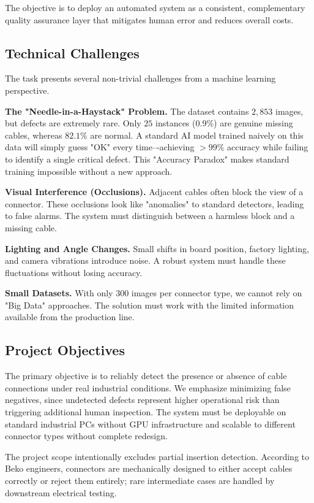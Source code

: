 \documentclass[11pt,a4paper]{article}
\begin{document}
The objective is to deploy an automated system as a consistent, complementary quality assurance layer that mitigates human error and reduces overall costs.

\subsection{Technical Challenges}

The task presents several non-trivial challenges from a machine learning perspective.

\textbf{The "Needle-in-a-Haystack" Problem.} The dataset contains $2,853$ images, but defects are extremely rare. Only $25$ instances ($0.9\%$) are genuine missing cables, whereas $82.1\%$ are normal. A standard AI model trained naively on this data will simply guess "OK" every time–-achieving $>99\%$ accuracy while failing to identify a single critical defect. This "Accuracy Paradox" makes standard training impossible without a new approach.

\textbf{Visual Interference (Occlusions).} Adjacent cables often block the view of a connector. These occlusions look like "anomalies" to standard detectors, leading to false alarms. The system must distinguish between a harmless block and a missing cable.

\textbf{Lighting and Angle Changes.} Small shifts in board position, factory lighting, and camera vibrations introduce noise. A robust system must handle these fluctuations without losing accuracy.

\textbf{Small Datasets.} With only 300 images per connector type, we cannot rely on "Big Data" approaches. The solution must work with the limited information available from the production line.

\subsection{Project Objectives}

The primary objective is to reliably detect the presence or absence of cable connections under real industrial conditions. We emphasize minimizing false negatives, since undetected defects represent higher operational risk than triggering additional human inspection. The system must be deployable on standard industrial PCs without GPU infrastructure and scalable to different connector types without complete redesign.

The project scope intentionally excludes partial insertion detection. According to Beko engineers, connectors are mechanically designed to either accept cables correctly or reject them entirely; rare intermediate cases are handled by downstream electrical testing.
\end{document}
